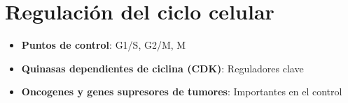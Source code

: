 \section{Regulación del ciclo celular}

\begin{itemize}
    \item \textbf{Puntos de control}: G1/S, G2/M, M
    \item \textbf{Quinasas dependientes de ciclina (CDK)}: Reguladores clave
    \item \textbf{Oncogenes y genes supresores de tumores}: Importantes en el control
\end{itemize}
